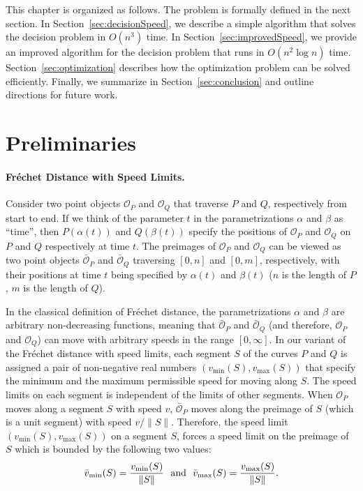 \documentclass[12pt]{dalthesis}
\newcommand{\Frechet}{Fr\'echet }
\newcommand{\CO}{{\mathscr O}}
\newcommand{\COB}{{\bar{\CO}}}
\newcommand{\Xmin}[2]{{#1}_{\min}(#2)}
\newcommand{\Xmax}[2]{{#1}_{\max}(#2)}
\newcommand{\umin}[1]{\Xmin{\bar{v}}{#1}}
\newcommand{\umax}[1]{\Xmax{\bar{v}}{#1}}
\newcommand{\vmin}[1]{\Xmin{v}{#1}}
\newcommand{\vmax}[1]{\Xmax{v}{#1}}
\begin{document}
This chapter is organized as follows. 
The problem is formally defined in the next section.
In Section~\ref{sec:decisionSpeed}, we describe a simple algorithm that solves the decision problem in $O(n^3)$ time.
In Section~\ref{sec:improvedSpeed}, we provide an improved algorithm for the decision problem 
that runs in $O(n^2\log n)$ time.
Section~\ref{sec:optimization} describes how the optimization problem can be solved efficiently.
Finally, we summarize in Section~\ref{sec:conclusion} and outline directions for future work.







\section{Preliminaries} \label{sec:preliminaries-Speed1}




\paragraph{\Frechet Distance with Speed Limits.}

Consider two point objects $\CO_P$ and $\CO_Q$ that traverse $P$ and $Q$, respectively 
from start to end.
If we think of the parameter $t$ in the parametrizations $\alpha$ and $\beta$
as ``time'', then $P(\alpha(t))$ and $Q(\beta(t))$ 
specify the positions of 
$\CO_P$ and $\CO_Q$ on $P$ and $Q$ respectively at time $t$.
The preimages of $\CO_P$ and $\CO_Q$ can be viewed as
two point objects $\COB_P$ and $\COB_Q$ traversing
$[0,n]$ and $[0,m]$, respectively,
with their positions at time $t$ being specified by $\alpha(t)$ and $\beta(t)$
($n$ is the length of $P$, $m$ is the length of $Q$).

In the classical definition of \Frechet distance,
the parametrizations $\alpha$ and $\beta$ are
arbitrary non-decreasing functions, 
meaning that $\COB_P$ and $\COB_Q$ (and therefore, $\CO_P$ and $\CO_Q$)
can move with arbitrary speeds in the range $[0,\infty]$.
In our variant of the \Frechet distance with speed limits,
each segment $S$ of the curves $P$ and $Q$
is assigned a pair of non-negative real numbers $(\vmin{S}, \vmax{S})$ 
that specify the minimum and the maximum permissible speed for moving along $S$.
The speed limits on each segment is independent of the limits of other segments.
When $\CO_P$ moves along a segment $S$ with speed $v$, 
$\COB_P$ moves along the preimage of $S$ (which is a unit segment) with speed $v/\|S\|$.
Therefore, the speed limit $(\vmin{S}, \vmax{S})$ on a segment $S$,
forces a speed limit on the preimage of $S$ which is bounded by the following two values:
\[
	\umin{S} = {\vmin{S} \over \|S\|} \ \ \mbox{and} \ \ \umax{S} = {\vmax{S} \over \|S\|}.
\]
\end{document}
